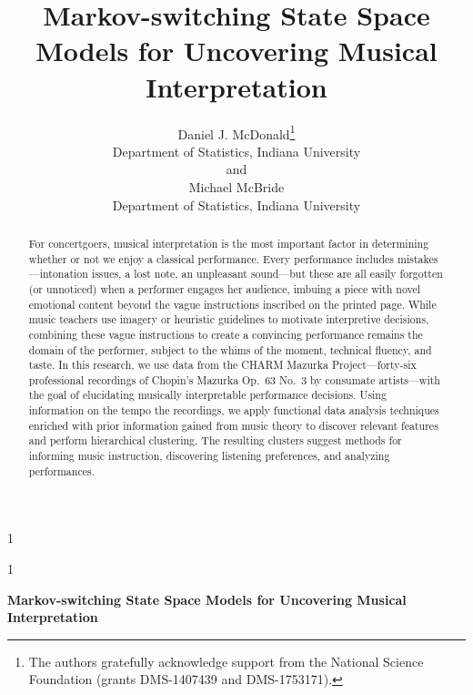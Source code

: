 \documentclass[12pt]{article}
\newcommand{\blind}{1}
\begin{document}
\blind
{
\title{Markov-switching State Space Models for Uncovering Musical Interpretation}
\author{Daniel J. McDonald\thanks{
    The authors gratefully acknowledge
    support from the National Science Foundation (grants DMS-1407439
    and DMS-1753171).}\hspace{.2cm}\\ 
    Department of Statistics, Indiana University\\
    and\\
    Michael McBride\\
    Department of Statistics, Indiana University}
\maketitle
} \fi

\blind
{
  \bigskip
  \bigskip
  \bigskip
  \begin{center}
    {\LARGE\bf Markov-switching State Space Models for Uncovering Musical Interpretation}
\end{center}
  \medskip
} \fi

\bigskip
\begin{abstract}
For concertgoers, musical interpretation is the most important factor
in determining whether or not we enjoy a classical performance. Every
performance includes mistakes---intonation issues, a lost note, an
unpleasant sound---but these are all easily forgotten (or unnoticed) when a performer
engages her audience, imbuing a piece with novel emotional content
beyond the vague instructions inscribed on the printed page. While music teachers use
imagery or heuristic guidelines to motivate interpretive decisions, combining these
vague instructions to create a convincing performance remains the domain
of the performer, subject to the whims of the moment, technical
fluency, and taste. In this
research, we use data from the CHARM Mazurka Project---forty-six professional
recordings of Chopin's Mazurka Op.\ 63 No.\ 3 by consumate artists---with the goal of
elucidating musically interpretable performance decisions. Using information on the
tempo the recordings, we apply functional data
analysis techniques enriched with prior information gained from music
theory to discover relevant features and perform hierarchical
clustering. The resulting clusters suggest methods for informing music
instruction, discovering listening preferences, and analyzing performances.

\end{abstract}
\end{document}
